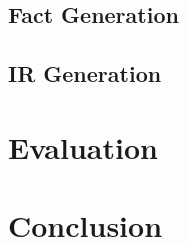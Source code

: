 \documentclass[12pt, a4paper]{report}
\theoremstyle{definition}
\newtheorem{definition}{Definition}[section]
\theoremstyle{definition}%
\newtheorem{example}{Example}[section]
\theoremstyle{definition}%
\theoremstyle{definition}%
\theoremstyle{definition}%
\theoremstyle{definition}%
\begin{document}
{    \section{Fact Generation}

    \section{IR Generation}

\chapter{Evaluation}

\chapter{Conclusion}














}
\end{document}
